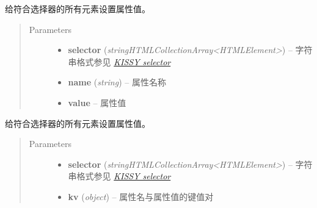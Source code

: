 \documentclass[letterpaper,10pt,english]{sphinxmanual}
\begin{document}

\begin{fulllineitems}
给符合选择器的所有元素设置属性值。
\begin{quote}\begin{description}
\item[{Parameters}] \leavevmode\begin{itemize}
\item {}
\textbf{selector} (\emph{string\textbar{}HTMLCollection\textbar{}Array\textless{}HTMLElement\textgreater{}}) -- 字符串格式参见 {\hyperref[api/core/dom/selector:dom-selector]{\emph{KISSY selector}}}

\item {}
\textbf{name} (\emph{string}) -- 属性名称

\item {}
\textbf{value} -- 属性值

\end{itemize}

\end{description}\end{quote}

\end{fulllineitems}



\begin{fulllineitems}
给符合选择器的所有元素设置属性值。
\begin{quote}\begin{description}
\item[{Parameters}] \leavevmode\begin{itemize}
\item {}
\textbf{selector} (\emph{string\textbar{}HTMLCollection\textbar{}Array\textless{}HTMLElement\textgreater{}}) -- 字符串格式参见 {\hyperref[api/core/dom/selector:dom-selector]{\emph{KISSY selector}}}

\item {}
\textbf{kv} (\emph{object}) -- 属性名与属性值的键值对

\end{itemize}

\end{description}\end{quote}

\end{fulllineitems}
\end{document}
